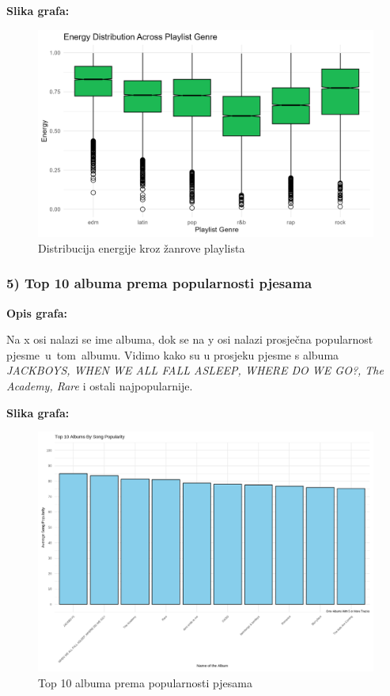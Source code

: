 		\textbf{Slika grafa:}
	\begin{figure}[H]
		\includegraphics[scale=0.9]{slike/Genre-Energy.png}
		\centering
		\caption{Distribucija energije kroz žanrove playlista}
		
	\end{figure}
	
	\subsubsection{5) Top 10 albuma prema popularnosti pjesama}
	
	\textbf{Opis grafa:}
	
	Na x osi nalazi se ime albuma, dok se na y osi nalazi prosječna popularnost pjesme u tom albumu. Vidimo kako su u prosjeku pjesme s albuma \textit{JACKBOYS, WHEN WE ALL FALL ASLEEP, WHERE DO WE GO?, The Academy, Rare} i ostali najpopularnije.
	
	
	\textbf{Slika grafa:}
	\begin{figure}[H]
		\includegraphics[scale=0.9]{slike/albums_by_song_popularity.png}
		\centering
		\caption{Top 10 albuma prema popularnosti pjesama}
		
	\end{figure}
	
